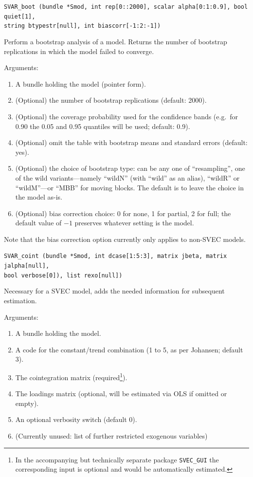 \documentclass[a4paper,10pt]{article}
\newenvironment{funcdoc}[1]
{\noindent\hrulefill\newline\nopagebreak\texttt{#1}%
\nopagebreak\par\noindent\hrulefill%
\nopagebreak\par\nopagebreak\smallskip\nopagebreak\par}
{\bigskip}
\begin{document}
\begin{funcdoc}{SVAR\_boot (bundle *Smod, int rep[0::2000], scalar alpha[0:1:0.9], bool
    quiet[1],\\
    string btypestr[null], int biascorr[-1:2:-1])}
    \noindent Perform a bootstrap analysis of a model. Returns the number of
  bootstrap replications in which the model failed to converge. 
  
  \noindent Arguments:
  
  \begin{enumerate}
  \item A bundle holding the model (pointer form).
  \item (Optional) the number of bootstrap replications (default: 2000).
  \item (Optional) the coverage probability used for the confidence bands (e.g.\ 
    for 0.90 the 0.05 and 0.95 quantiles will be used; default: 0.9).
  \item (Optional) omit the table with bootstrap means and standard
    errors (default: yes).
  \item (Optional) the choice of bootstrap type: can be any one of
    ``resampling'', one of the wild variants---namely ``wildN'' (with
    ``wild'' as an alias), ``wildR'' or ``wildM''---or ``MBB'' for
    moving blocks. The default is to leave the choice in the model
    as-is.
  \item (Optional) bias correction choice: 0 for none, 1 for partial,
    2 for full; the default value of $-1$ preserves whatever setting
    is the model.
  \end{enumerate}
  Note that the bias correction option currently only applies to
  non-SVEC models.
\end{funcdoc}

\begin{funcdoc}{SVAR\_coint (bundle *Smod, int dcase[1:5:3],
			   matrix jbeta, matrix jalpha[null],\\
			   bool verbose[0]), list rexo[null])}
  \noindent Necessary for a SVEC model, adds the needed information 
  for subsequent estimation. 
  
  \noindent Arguments:
  \begin{enumerate}
  \item A bundle holding the model.
  \item A code for the constant/trend combination (1 to 5, as per
    Johansen; default 3).
  \item The cointegration matrix (required\footnote{In the accompanying but 
  technically separate package \texttt{SVEC\_GUI} the corresponding input is optional and
  would be automatically estimated.}).
  \item The loadings matrix (optional, will be estimated via OLS if
    omitted or empty).
  \item An optional verbosity switch (default 0).
  \item (Currently unused: list of further restricted exogenous
    variables)
  \end{enumerate}
\end{funcdoc}
\end{document}
